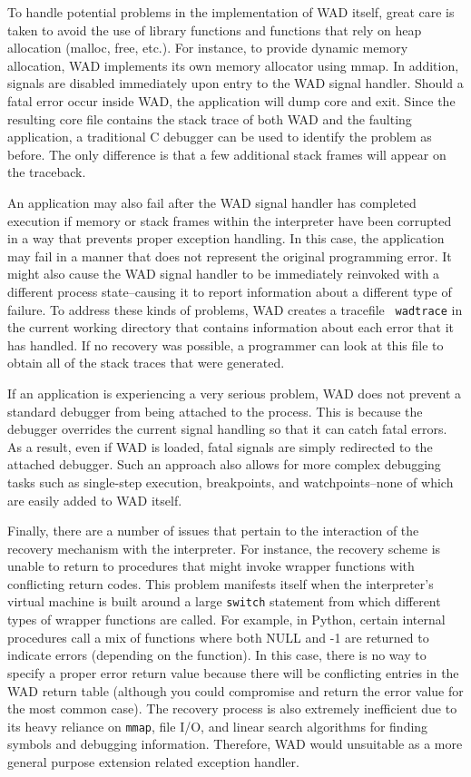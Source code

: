 To handle potential problems in the implementation of WAD itself,
great care is taken to avoid the use of library functions and
functions that rely on heap allocation (malloc, free, etc.).  For
instance, to provide dynamic memory allocation, WAD implements its own
memory allocator using mmap.  In addition, signals are disabled
immediately upon entry to the WAD signal handler.  Should a fatal
error occur inside WAD, the application will dump core and exit.  Since
the resulting core file contains the stack trace of both WAD and the
faulting application, a traditional C debugger can be used to identify
the problem as before.  The only difference is that a few additional
stack frames will appear on the traceback.

An application may also fail after the WAD signal handler has completed
execution if memory or stack frames within the interpreter have been
corrupted in a way that prevents proper exception handling. In this case, the
application may fail in a manner that does not represent the original
programming error. It might also cause the WAD signal handler to be
immediately reinvoked with a different process state--causing it to
report information about a different type of failure.  To address
these kinds of problems, WAD creates a tracefile {\tt
wadtrace} in the current working directory that contains information
about each error that it has handled.  If no recovery was possible, a
programmer can look at this file to obtain all of the stack traces
that were generated.

If an application is experiencing a very serious problem, WAD
does not prevent a standard debugger from being attached to the
process.  This is because the debugger overrides the current signal
handling so that it can catch fatal errors.  As a result, even if WAD
is loaded, fatal signals are simply redirected to the attached
debugger.  Such an approach also allows for more complex debugging
tasks such as single-step execution, breakpoints, and
watchpoints--none of which are easily added to WAD itself.

%
%

Finally, there are a number of issues that pertain
to the interaction of the recovery mechanism with the interpreter.
For instance, the recovery scheme is unable to return to procedures
that might invoke wrapper functions with conflicting return codes.
This problem manifests itself when the interpreter's virtual
machine is built around a large {\tt switch} statement from which different
types of wrapper functions are called.  For example, in Python, certain
internal procedures call a mix of functions where both NULL and -1 are
returned to indicate errors (depending on the function).  In this case, there
is no way to specify a proper error return value because there will be
conflicting entries in the WAD return table (although you could compromise and
return the error value for the most common case).   The recovery
process is also extremely inefficient due to its heavy reliance on
{\tt mmap}, file I/O, and linear search algorithms for finding symbols
and debugging information.  Therefore, WAD would 
unsuitable as a more general purpose extension related exception handler.

